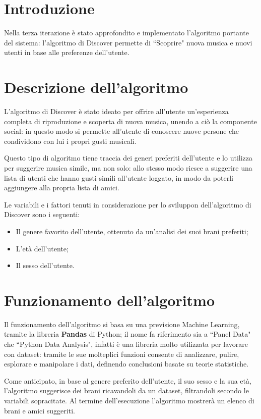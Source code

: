 \section{Introduzione}
Nella terza iterazione è stato approfondito e implementato l'algoritmo portante del sistema: l'algoritmo di Discover permette di ``Scoprire" nuova 
musica e nuovi utenti in base alle preferenze dell'utente.


\section{Descrizione dell'algoritmo}
L'algoritmo di Discover è stato ideato per offrire all'utente un'esperienza completa di riproduzione e scoperta di nuova musica, unendo a ciò la 
componente social: in questo modo si permette all'utente di conoscere nuove persone che condividono con lui i propri gusti musicali. 

Questo tipo di algoritmo 
tiene traccia dei generi preferiti dell'utente e lo utilizza per suggerire musica simile, ma non solo: allo stesso modo riesce a suggerire 
una lista di utenti che hanno gusti simili all'utente loggato, in modo da poterli aggiungere alla propria lista di amici.  

Le variabili e i fattori tenuti in considerazione per lo sviluppon dell'algoritmo di Discover sono i seguenti: 
\begin{itemize}
    \item Il genere favorito dell'utente, ottenuto da un'analisi dei suoi brani preferiti;
    \item L'età dell'utente;
    \item Il sesso dell'utente.
\end{itemize}


\newpage
\section{Funzionamento dell'algoritmo}
Il funzionamento dell'algoritmo si basa su una previsione Machine Learning, tramite la libreria \textbf{Pandas} di Python;
il nome fa riferimento sia a ``Panel Data" che ``Python Data Analysis", infatti è una libreria molto utilizzata per lavorare 
con dataset: tramite le sue molteplici funzioni consente di analizzare, pulire, esplorare e manipolare i dati, definendo 
conclusioni basate su teorie statistiche. 

Come anticipato, in base al genere preferito dell'utente, il suo sesso e la sua età, l'algoritmo suggerisce dei brani ricavandoli 
da un dataset, filtrandoli secondo le variabili sopracitate. Al termine dell'esecuzione l'algoritmo mostrerà un elenco di brani e amici suggeriti.

